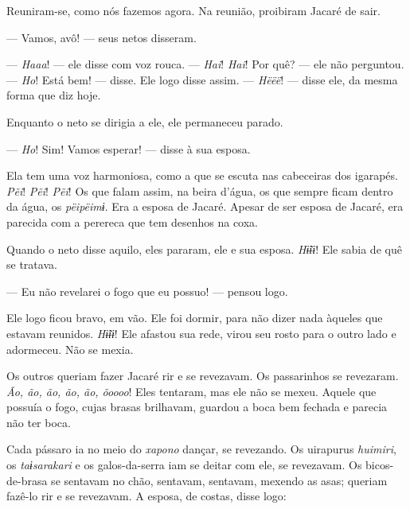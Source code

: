 Reuniram-se, como nós fazemos agora. Na reunião, proibiram Jacaré de sair. 

--- Vamos, avô! --- seus netos disseram. 



--- \textit{Haaa}! --- ele disse com voz rouca. --- \textit{Hai}! \textit{Hai}! Por quê? --- ele não perguntou. --- \textit{Ho}! Está bem! --- disse. Ele logo disse assim. --- \textit{Hëëë}! --- disse ele, da mesma forma que diz hoje. 

Enquanto o neto se dirigia a ele, ele permaneceu parado. 

--- \textit{Ho}! Sim! Vamos esperar! --- disse à sua esposa. 

Ela tem uma voz harmoniosa, como a que se escuta nas cabeceiras dos
igarapés. \textit{Pẽi}! \textit{Pẽi}! \textit{Pẽi}! Os que falam assim, na beira d'água, os
que sempre ficam dentro da água, os \textit{pëipëimɨ}. Era a esposa de
Jacaré. Apesar de ser esposa de Jacaré, era parecida com a perereca que
tem desenhos na coxa. 

Quando o neto disse aquilo, eles pararam, ele e sua esposa. \textit{Hɨ̃ɨɨ}!
Ele sabia de quê se tratava. 

--- Eu não revelarei o fogo que eu possuo! --- pensou logo. 

Ele logo ficou bravo, em vão. Ele foi dormir, para não dizer nada
àqueles que estavam reunidos. \textit{Hɨ̃ɨɨ}! Ele afastou sua rede, virou
seu rosto para o outro lado e adormeceu. Não se mexia. 

Os outros queriam fazer Jacaré rir e se revezavam. Os passarinhos se
revezaram. \textit{Ão, ão, ão, ão, ão, õoooo}! Eles tentaram, mas ele não
se mexeu. Aquele que possuía o fogo, cujas brasas brilhavam, guardou a
boca bem fechada e parecia não ter boca. 

Cada pássaro ia no meio do \textit{xapono} dançar, se revezando.
Os uirapurus \textit{huimiri}, os \textit{taɨsarakari} e os galos-da-serra iam se deitar
com ele, se revezavam. Os bicos-de-brasa se sentavam no chão, sentavam,
sentavam, mexendo as asas; queriam fazê-lo rir e se revezavam. A esposa,
de costas, disse logo: 

